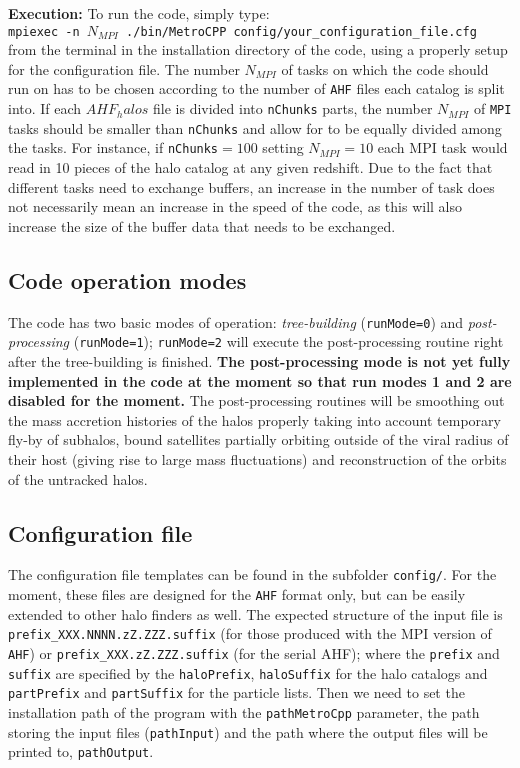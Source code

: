 \documentclass{article}
\begin{document}
\textbf{Execution:}
To run the code, simply type:\\

\texttt{mpiexec -n $N_{MPI}$ ./bin/MetroCPP config/your\_configuration\_file.cfg}\\

\noindent
from the terminal in the installation directory of the code, using a properly setup for the configuration file.
The number $N_{MPI}$ of tasks on which the code should run on has to be chosen according to the number of \texttt{AHF} files each catalog
is split into. If each $AHF_halos$ file is divided into \texttt{nChunks} parts, the number $N_{MPI}$ 
of \texttt{MPI} tasks should be smaller than \texttt{nChunks} and allow for to be equally divided among the tasks.
For instance, if \texttt{nChunks}$=100$ setting $N_{MPI} = 10$ each MPI task would read in 10 pieces of the 
halo catalog at any given redshift.
Due to the fact that different tasks need to exchange buffers, an increase in the number of task does not necessarily mean
an increase in the speed of the code, as this will also increase the size of the buffer data that needs to be exchanged.



\subsection{Code operation modes}

The code has two basic modes of operation: \emph{tree-building} (\texttt{runMode=0}) and \emph{post-processing}
(\texttt{runMode=1}); \texttt{runMode=2} will execute the post-processing routine right after the tree-building is finished.
\textbf{The post-processing mode is not yet fully implemented in the code at the moment so that run modes 1 and 2 are disabled 
for the moment.} The post-processing routines will be smoothing out the mass accretion histories of the halos properly taking into 
account temporary fly-by of subhalos, bound satellites partially orbiting outside of the viral radius of their host (giving rise
to large mass fluctuations) and reconstruction of the orbits of the untracked halos.


\subsection{Configuration file}

The configuration file templates can be found in the subfolder \texttt{config/}. For the moment, these files are
designed for the \texttt{AHF} format only, but can be easily extended to other halo finders as well.
The expected structure of the input file is \texttt{prefix\_XXX.NNNN.zZ.ZZZ.suffix} (for those produced with the 
MPI version of \texttt{AHF}) or \texttt{prefix\_XXX.zZ.ZZZ.suffix} (for the serial AHF); where the \texttt{prefix} and
\texttt{suffix} are specified by the \texttt{haloPrefix}, \texttt{haloSuffix} for the halo catalogs and 
\texttt{partPrefix} and \texttt{partSuffix} for the particle lists.
Then we need to set the installation path of the program with the \texttt{pathMetroCpp} parameter, the path storing 
the input files (\texttt{pathInput}) and the path where the output files will be printed to, \texttt{pathOutput}.
\end{document}

